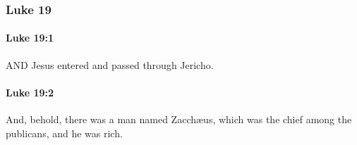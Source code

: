 	\subsubsection{Luke 19} %
		\label{LUKE-19}
		
		\paragraph{Luke 19:1} %
			\label{LUKE-19-1}

			AND Jesus entered and passed through Jericho.

			\begin{framed}
			\scriptsize
				\begin{compactdesc}
					\item[SBLG] 
				\end{compactdesc}
			\end{framed}

		\paragraph{Luke 19:2} %
			\label{LUKE-19-2}

			And, behold, there was a man named Zacchæus, which was the chief among the publicans, and he was rich.

